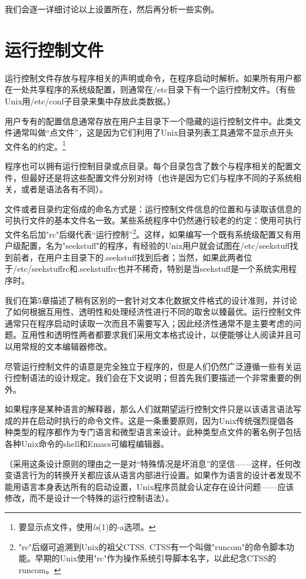 \documentclass[12pt,oneside]{ctexbook}
\begin{document}
\begin{common-format}
我们会逐一详细讨论以上设置所在，然后再分析一些实例。

\section{运行控制文件}
运行控制文件存放与程序相关的声明或命令，在程序启动时解析。如果所有用户都在一处共享程序的系统级配置，则通常在/etc目录下有一个运行控制文件。（有些Unix用/etc/conf子目录来集中存放此类数据。）

用户专有的配置信息通常存放在用户主目录下一个隐藏的运行控制文件中。此类文件通常叫做“点文件”，这是因为它们利用了Unix目录列表工具通常不显示点开头文件名的约定。\footnote{要显示点文件，使用\textit{ls}(1)的-a选项。}

程序也可以拥有运行控制目录或点目录。每个目录包含了数个与程序相关的配置文件，但最好还是将这些配置文件分别对待（也许是因为它们与程序不同的子系统相关，或者是语法各有不同）。

文件或者目录约定俗成的命名方式是：运行控制文件信息的位置和与读取该信息的可执行文件的基本文件名一致。某些系统程序中仍然通行较老的约定：使用可执行文件名后加"rc"后缀代表“运行控制”\footnote{"rc"后缀可追溯到Unix的祖父CTSS. CTSS有一个叫做"runcom"的命令脚本功能。早期的Unix使用"rc"作为操作系统引导脚本名字，以此纪念CTSS的runcom。}。这样，如果编写一个既有系统级配置又有用户级配置，名为"seekstuff"的程序，有经验的Unix用户就会试图在/etc/seekstuff找到前者，在用户主目录下的.seekstuff找到后者；当然，如果此两者位于/etc/seekstuffrc和.seekstuffrc也并不稀奇，特别是当seekstuff是一个系统实用程序时。

我们在第5章描述了稍有区别的一套针对文本化数据文件格式的设计准则，并讨论了如何根据互用性、透明性和处理经济性进行不同的取舍以臻最优。运行控制文件通常只在程序启动时读取一次而且不需要写入；因此经济性通常不是主要考虑的问题。互用性和透明性两者都要求我们采用文本格式设计，以便能够让人阅读并且可以用常规的文本编辑器修改。

尽管运行控制文件的语意是完全独立于程序的，但是人们仍然广泛遵循一些有关运行控制语法的设计规定。我们会在下文说明；但首先我们要描述一个非常重要的例外。

如果程序是某种语言的解释器，那么人们就期望运行控制文件只是以该语言语法写成的并在启动时执行的命令文件。这是一条重要原则，因为Unix传统强烈提倡各种类型的程序都作为专门语言和微型语言来设计。此种类型点文件的著名例子包括各种Unix命令的shell和Emacs可编程编辑器。

（采用这条设计原则的理由之一是对“特殊情况是坏消息”的坚信——这样，任何改变语言行为的转换开关都应该从语言内部进行设置。如果作为语言的设计者发现不能用语言本身表达所有的启动设置，Unix程序员就会认定存在设计问题——应该修改，而不是设计一个特殊的运行控制语法）。


\end{common-format}
\end{document}
